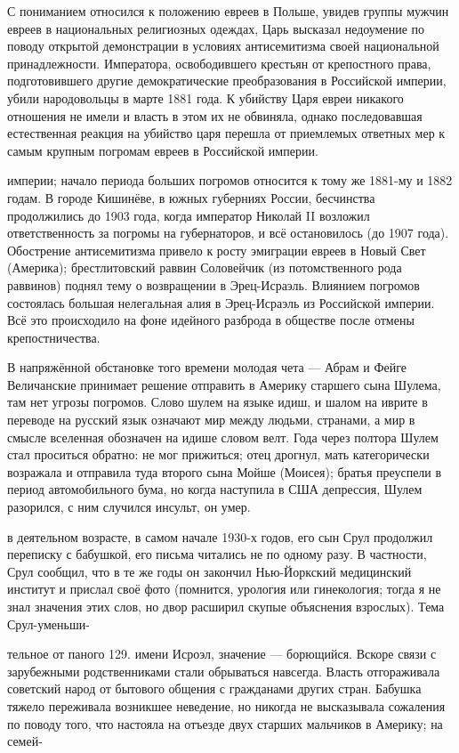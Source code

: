 С пониманием относился к положению евреев в Польше, увидев группы мужчин евреев в национальных религиозных одеждах, Царь высказал недоумение по поводу открытой демонстрации в условиях антисемитизма своей национальной принадлежности. Императора, освободившего крестьян от крепостного права, подготовившего другие демократические преобразования в Российской империи, убили народовольцы в марте 1881 года. К убийству Царя евреи никакого отношения не имели и власть в этом их не обвиняла, однако последовавшая естественная реакция на убийство царя перешла от приемлемых ответных мер к самым крупным погромам евреев в Российской империи.

империи; начало периода больших погромов относится к тому же 1881-му и 1882 годам. В городе Кишинёве, в южных губерниях России, бесчинства продолжились до 1903 года, когда император Николай II возложил ответственность за погромы на губернаторов, и всё остановилось (до 1907 года). Обострение антисемитизма привело к росту эмиграции евреев в Новый Свет (Америка); брестлитовский раввин Соловейчик (из потомственного рода раввинов) поднял тему о возвращении в Эрец-Исраэль. Влиянием погромов состоялась большая нелегальная алия в Эрец-Исраэль из Российской империи. Всё это происходило на фоне идейного разброда в обществе после отмены крепостничества.

В напряжённой обстановке того времени молодая чета — Абрам и Фейге Величанские принимает решение отправить в Америку старшего сына Шулема, там нет угрозы погромов. Слово шулем на языке идиш, и шалом на иврите в переводе на русский язык означают мир между людьми, странами, а мир в смысле вселенная обозначен на идише словом велт. Года через полтора Шулем стал проситься обратно: не мог прижиться; отец дрогнул, мать категорически возражала и отправила туда второго сына Мойше (Моисея); братья преуспели в период автомобильного бума, но когда наступила в США депрессия, Шулем разорился, с ним случился инсульт, он умер.

в деятельном возрасте, в самом начале 1930-х годов, его сын Срул продолжил переписку с бабушкой, его письма читались не по одному разу. В частности, Срул сообщил, что в те же годы он закончил Нью-Йоркский медицинский институт и прислал своё фото (помнится, урология или гинекология; тогда я не знал значения этих слов, но двор расширил скупые объяснения взрослых). Тема Срул-уменьши-

тельное от паного 129. имени Исроэл, значение — борющийся. Вскоре связи с зарубежными родственниками стали обрываться навсегда. Власть отгораживала советский народ от бытового общения с гражданами других стран. Бабушка тяжело переживала возникшее неведение, но никогда не высказывала сожаления по поводу того, что настояла на отъезде двух старших мальчиков в Америку; на семей-

